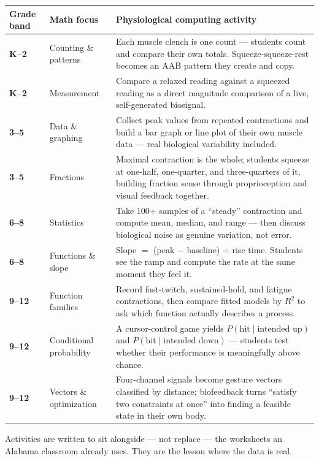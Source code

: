 \documentclass[10pt,letterpaper]{article}
\begin{document}
{\fontsize{8.3}{10.2}\selectfont
\begin{tabularx}{\linewidth}{@{}>{\bfseries}p{1.55cm} p{3.0cm} X@{}}
\toprule
Grade band & Math focus & Physiological computing activity \\
\midrule
K--2 & Counting \& patterns & Each muscle clench is one count --- students count and compare their own totals. Squeeze-squeeze-rest becomes an AAB pattern they create and copy. \\
K--2 & Measurement & Compare a relaxed reading against a squeezed reading as a direct magnitude comparison of a live, self-generated biosignal. \\
3--5 & Data \& graphing & Collect peak values from repeated contractions and build a bar graph or line plot of their own muscle data --- real biological variability included. \\
3--5 & Fractions & Maximal contraction is the whole; students squeeze at one-half, one-quarter, and three-quarters of it, building fraction sense through proprioception and visual feedback together. \\
6--8 & Statistics & Take 100+ samples of a ``steady'' contraction and compute mean, median, and range --- then discuss biological noise as genuine variation, not error. \\
6--8 & Functions \& slope & Slope $=$ (peak $-$ baseline) $\div$ rise time. Students see the ramp and compute the rate at the same moment they feel it. \\
9--12 & Function families & Record fast-twitch, sustained-hold, and fatigue contractions, then compare fitted models by $R^2$ to ask which function actually describes a process. \\
9--12 & Conditional probability & A cursor-control game yields $P(\text{hit}\mid\text{intended up})$ and $P(\text{hit}\mid\text{intended down})$ --- students test whether their performance is meaningfully above chance. \\
9--12 & Vectors \& optimization & Four-channel signals become gesture vectors classified by distance; biofeedback turns ``satisfy two constraints at once'' into finding a feasible state in their own body. \\
\bottomrule
\end{tabularx}\par}

\vspace{6pt}
{\color{htilgray}\small Activities are written to sit alongside --- not replace --- the worksheets an Alabama classroom already uses. They are the lesson where the data is real.\par}
\end{document}
